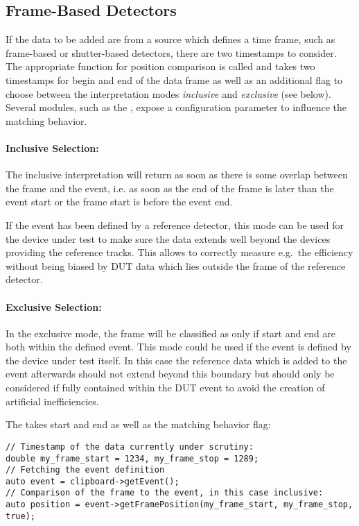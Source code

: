 \subsection{Frame-Based Detectors}
If the data to be added are from a source which defines a time frame, such as frame-based or shutter-based detectors, there are two timestamps to consider.
The appropriate function for position comparison is called  and takes two timestamps for begin and end of the data frame as well as an additional flag to choose between the interpretation modes \emph{inclusive} and \emph{exclusive} (see below).
Several modules, such as the , expose a configuration parameter to influence the matching behavior.

\paragraph{Inclusive Selection:}
The inclusive interpretation will return  as soon as there is some overlap between the frame and the event, i.e. as soon as the end of the frame is later than the event start or the frame start is before the event end.

If the event has been defined by a reference detector, this mode can be used for the device under test to make sure the data extends well beyond the devices providing the reference tracks.
This allows to correctly measure e.g.\ the efficiency without being biased by DUT data which lies outside the frame of the reference detector.

\paragraph{Exclusive Selection:}
In the exclusive mode, the frame will be classified as  only if start and end are both within the defined event.
This mode could be used if the event is defined by the device under test itself.
In this case the reference data which is added to the event afterwards should not extend beyond this boundary but should only be considered if fully contained within the DUT event to avoid the creation of artificial inefficiencies.

The  takes start and end as well as the matching behavior flag:

\begin{verbatim}
// Timestamp of the data currently under scrutiny:
double my_frame_start = 1234, my_frame_stop = 1289;
// Fetching the event definition
auto event = clipboard->getEvent();
// Comparison of the frame to the event, in this case inclusive:
auto position = event->getFramePosition(my_frame_start, my_frame_stop, true);
\end{verbatim}

